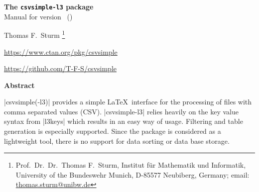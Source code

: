 \documentclass[a4paper,11pt]{ltxdoc}
\begin{document}
\begin{center}
\begin{tcolorbox}[enhanced,hbox,tikznode,left=8mm,right=8mm,boxrule=0.4pt,
  colback=white,colframe=black!50!yellow,
  drop lifted shadow=black!50!yellow,arc is angular,
  before=\par\vspace*{5mm},after=\par\bigskip]
{\bfseries\LARGE The \texttt{csvsimple-l3} package}\\[3mm]
{\large Manual for version \version\ (\datum)}
\end{tcolorbox}
{\large Thomas F.~Sturm%
  \footnote{Prof.~Dr.~Dr.~Thomas F.~Sturm, Institut f\"{u}r Mathematik und Informatik,
    University of the Bundeswehr Munich, D-85577 Neubiberg, Germany;
     email: \href{mailto:thomas.sturm@unibw.de}{thomas.sturm@unibw.de}}\par\medskip
\normalsize\url{https://www.ctan.org/pkg/csvsimple}\par
\url{https://github.com/T-F-S/csvsimple}
}
\end{center}
\bigskip
\begin{absquote}
  \begin{center}\bfseries Abstract\end{center}
  |csvsimple(-l3)| provides a simple \LaTeX\ interface for the processing of files with
  comma separated values (CSV). |csvsimple-l3| relies heavily on the key value
  syntax from |l3keys| which results in an easy way of usage.
  Filtering and table generation is especially supported. Since the package
  is considered as a lightweight tool, there is no support for data sorting
  or data base storage.
\end{absquote}

\vspace{1cm}
\end{document}
